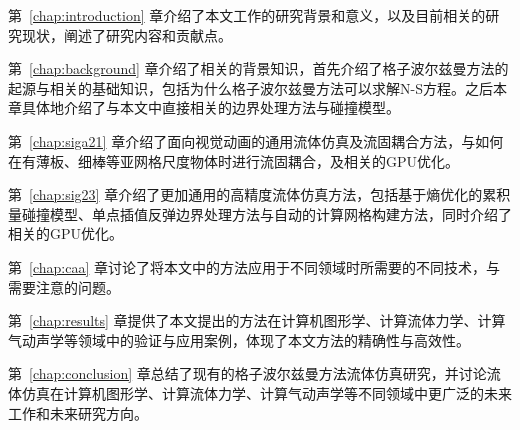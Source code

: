 第~\ref{chap:introduction} 章介绍了本文工作的研究背景和意义，以及目前相关的研究现状，阐述了研究内容和贡献点。

第~\ref{chap:background} 章介绍了相关的背景知识，首先介绍了格子波尔兹曼方法的起源与相关的基础知识，包括为什么格子波尔兹曼方法可以求解N-S方程。之后本章具体地介绍了与本文中直接相关的边界处理方法与碰撞模型。

第~\ref{chap:siga21} 章介绍了面向视觉动画的通用流体仿真及流固耦合方法，与如何在有薄板、细棒等亚网格尺度物体时进行流固耦合，及相关的GPU优化。

第~\ref{chap:sig23} 章介绍了更加通用的高精度流体仿真方法，包括基于熵优化的累积量碰撞模型、单点插值反弹边界处理方法与自动的计算网格构建方法，同时介绍了相关的GPU优化。

第~\ref{chap:caa} 章讨论了将本文中的方法应用于不同领域时所需要的不同技术，与需要注意的问题。

第~\ref{chap:results} 章提供了本文提出的方法在计算机图形学、计算流体力学、计算气动声学等领域中的验证与应用案例，体现了本文方法的精确性与高效性。

第~\ref{chap:conclusion} 章总结了现有的格子波尔兹曼方法流体仿真研究，并讨论流体仿真在计算机图形学、计算流体力学、计算气动声学等不同领域中更广泛的未来工作和未来研究方向。